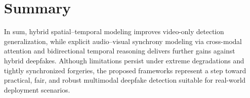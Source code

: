 \section{Summary}
In sum, hybrid spatial--temporal modeling improves video-only detection generalization, while explicit audio--visual synchrony modeling via cross-modal attention and bidirectional temporal reasoning delivers further gains against hybrid deepfakes. Although limitations persist under extreme degradations and tightly synchronized forgeries, the proposed frameworks represent a step toward practical, fair, and robust multimodal deepfake detection suitable for real-world deployment scenarios.